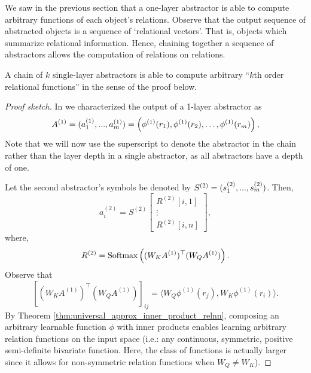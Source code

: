 We saw in the previous section that a one-layer abstractor is able to compute arbitrary functions  of each object's relations. Observe that the output sequence of abstracted objects is a sequence of `relational vectors'. That is, objects which summarize relational information. Hence, chaining together a sequence of  abstractors allows the computation of relations on relations.

\begin{lemma}
	\label{lemma:function_class_composed_abstractors}
	A chain of $k$ single-layer  abstractors is able to compute arbitrary ``$k$th order relational functions'' in the sense of the proof below.
\end{lemma}
\begin{proof}[Proof sketch]
	In  we characterized the output of a 1-layer abstractor as
	\begin{equation*}
		A^{(1)} = (a_1^{(1)}, ..., a_\m^{(1)}) = \left(\phi^{(1)}(r_1), \phi^{(1)}(r_2), \ldots, \phi^{(1)}(r_\m)\right),
	\end{equation*}
	Note that we will now use the superscript to denote the abstractor in the chain rather than the layer depth in a single  abstractor, as all  abstractors have a depth of one.

	Let the second abstractor's symbols be denoted by $S^{(2)} = (s_1^{(2)}, ..., s_m^{(2)})$. Then,
	\begin{equation*}
		a_i^{(2)} = S^{(2)} \begin{bmatrix}R^{(2)}[i,1] \\ \vdots \\ R^{(2)}[i,n]\end{bmatrix},
	\end{equation*}
	where,
	\begin{equation*}
		R^{(2)} = \Softmax\left((W_K A^{(1)})^\top (W_Q A^{(1)})\right).
	\end{equation*}
	Observe that
	\begin{equation*}
		\left[(W_K A^{(1)})^\top (W_Q A^{(1)})\right]_{ij} = \langle W_Q \phi^{(1)}(r_j), W_K \phi^{(1)}(r_i) \rangle.
	\end{equation*}
	By Theorem \ref{thm:universal_approx_inner_product_relnn}, composing an arbitrary learnable function $\phi$ with inner products enables learning arbitrary relation functions on the input space (i.e.: any continuous, symmetric, positive semi-definite bivariate function. Here, the class of functions is actually larger since it allows for non-symmetric relation functions when $W_Q \neq W_K$).


\end{proof}
